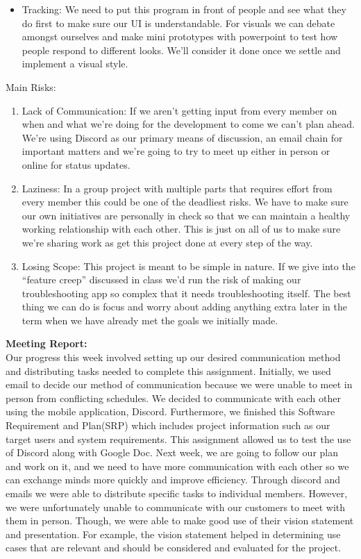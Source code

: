 \documentclass[12pt, letterpaper]{article}
\begin{document}
\begin{enumerate}
\begin{itemize}
		\item Tracking: We need to put this program in front of people and see what they do first to make sure our UI is understandable. For visuals we can debate amongst ourselves and make mini prototypes with powerpoint to test how people respond to different looks. We’ll consider it done once we settle and implement a visual style. 
	\end{itemize}
	\end{enumerate}
	Main Risks:	
	\begin{enumerate}
		\item Lack of Communication: If we aren’t getting input from every member on when and what we’re doing for the development to come we can’t plan ahead. We’re using Discord as our primary means of discussion, an email chain for important matters and we’re going to try to meet up either in person or online for status updates. 
		\item Laziness: In a group project with multiple parts that requires effort from every member this could be one of the deadliest risks. We have to make sure our own initiatives are personally in check so that we can maintain a healthy working relationship with each other. This is just on all of us to make sure we’re sharing work as get this project done at every step of the way.
		\item Losing Scope: This project is meant to be simple in nature. If we give into the “feature creep” discussed in class we’d run the risk of making our troubleshooting app so complex that it needs troubleshooting itself. The best thing we can do is focus and worry about adding anything extra later in the term when we have already met the goals we initially made. 
	\end{enumerate}
\textbf{Meeting Report:}
\\Our progress this week involved setting up our desired communication method and distributing tasks needed to complete this assignment. Initially, we used email to decide our method of communication because we were unable to meet in person from conflicting schedules. We decided to communicate with each other using the mobile application, Discord.  Furthermore, we finished this Software Requirement and Plan(SRP) which includes project information such as our target users and system requirements. This assignment allowed us to test the use of Discord along with Google Doc. 
Next week, we are going to follow our plan and work on it, and we need to have more communication with each other so we can exchange minds more quickly and improve efficiency. 
Through discord and emails we were able to distribute specific tasks to individual members. However, we were unfortunately unable to communicate with our customers to meet with them in person. Though, we were able to make good use of their vision statement and presentation. For example, the vision statement helped in determining use cases that are relevant and should be considered and evaluated for the project.
\end{document}
